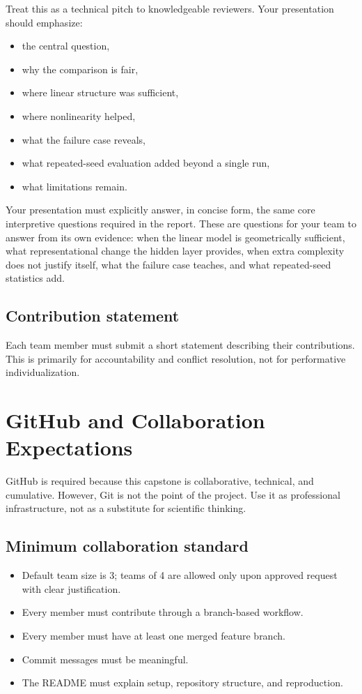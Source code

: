 \documentclass[11pt]{article}
\begin{document}
Treat this as a technical pitch to knowledgeable reviewers. Your presentation should emphasize:

\begin{itemize}
    \item the central question,
    \item why the comparison is fair,
    \item where linear structure was sufficient,
    \item where nonlinearity helped,
    \item what the failure case reveals,
    \item what repeated-seed evaluation added beyond a single run,
    \item what limitations remain.
\end{itemize}

Your presentation must explicitly answer, in concise form, the same core interpretive questions required in the report. These are questions for your team to answer from its own evidence: when the linear model is geometrically sufficient, what representational change the hidden layer provides, when extra complexity does not justify itself, what the failure case teaches, and what repeated-seed statistics add.

\subsection{Contribution statement}

Each team member must submit a short statement describing their contributions. This is primarily for accountability and conflict resolution, not for performative individualization.

\section{GitHub and Collaboration Expectations}

GitHub is required because this capstone is collaborative, technical, and cumulative. However, Git is not the point of the project. Use it as professional infrastructure, not as a substitute for scientific thinking.

\subsection{Minimum collaboration standard}

\begin{itemize}
    \item Default team size is 3; teams of 4 are allowed only upon approved request with clear justification.
    \item Every member must contribute through a branch-based workflow.
    \item Every member must have at least one merged feature branch.
    \item Commit messages must be meaningful.
    \item The README must explain setup, repository structure, and reproduction.
\end{itemize}
\end{document}
